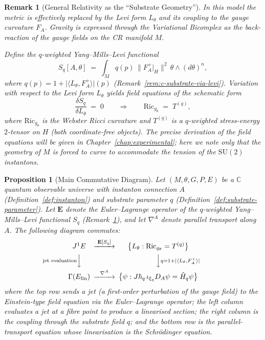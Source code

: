 \documentclass[12pt,a4paper]{report}
\newtheorem{proposition}[theorem]{Proposition}
\newtheorem{remark}[theorem]{Remark}
\begin{document}
\begin{remark}[General Relativity as the ``Substrate Geometry'']
\label{rem:gr-substrate-geometry}
In this model the metric is effectively replaced by the Levi form
$L_\theta$ and its coupling to the gauge curvature $F_A$.  Gravity is
expressed through the Variational Bicomplex as the back-reaction of the
gauge fields on the CR manifold $M$.

Define the \emph{$q$-weighted Yang--Mills--Levi functional}
\[
  S_q[A, \theta]
  \;=\; \int_M q(p)\,\lVert F_A^+|_H \rVert^2\,
        \theta \wedge (d\theta)^n,
\]
where $q(p) = 1 + \lvert\langle L_\theta, F_A^+\rangle\rvert(p)$
(Remark~\ref{rem:c-substrate-via-levi}).
Variation with respect to the Levi form $L_\theta$ yields field equations
of the schematic form
\[
  \frac{\delta S_q}{\delta L_\theta}
  \;=\; 0
  \qquad\Longrightarrow\qquad
  \mathrm{Ric}_{g_\theta} \;=\; T^{(q)},
\]
where $\mathrm{Ric}_{g_\theta}$ is the Webster Ricci curvature and
$T^{(q)}$ is a $q$-weighted stress-energy $2$-tensor on $H$ (both
coordinate-free objects).  The precise derivation of the field equations
will be given in Chapter~\ref{chap:experimental}; here we note only that
the geometry of $M$ is forced to curve to accommodate the tension of the
$\mathrm{SU}(2)$ instantons.
\end{remark}

\begin{proposition}[Main Commutative Diagram]
\label{prop:main-commutative-diagram}
Let $(M, \theta, G, P, E)$ be a $\mathbb{C}$ quantum observable universe
with instanton connection $A$ (Definition~\ref{def:instanton}) and substrate
parameter $q$ (Definition~\ref{def:substrate-parameter}).  Let
$\mathbf{E}$ denote the Euler--Lagrange operator of the
$q$-weighted Yang--Mills--Levi functional $S_q$
(Remark~\ref{rem:gr-substrate-geometry}), and let $\nabla^A$ denote
parallel transport along $A$.  The following diagram commutes:
\[
\begin{CD}
J^1E @>{\mathbf{E}[S_q]}>>
  \bigl\{ L_\theta : \mathrm{Ric}_{g_\theta} = T^{(q)} \bigr\} \\
@V{\text{jet evaluation}}VV
  @VV{q = 1 + \lvert\langle L_\theta, F_A^+\rangle\rvert}V \\
\Gamma(E_{\mathrm{lin}}) @>{\nabla^A}>>
  \bigl\{ \psi : J\hbar_q\,\iota_{\xi_q}D_A\psi = \hat{H}_q\psi \bigr\}
\end{CD}
\]
where the top row sends a jet (a first-order perturbation of the gauge field)
to the Einstein-type field equation via the Euler--Lagrange operator; the
left column evaluates a jet at a fibre point to produce a linearised section;
the right column is the coupling through the substrate field $q$; and the
bottom row is the parallel-transport equation whose linearisation is the
Schr\"odinger equation.
\end{proposition}
\end{document}
